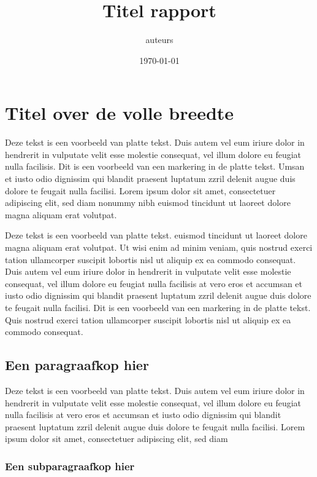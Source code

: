 \documentclass[dutch]{uureport}
\title[subtitle]{Titel rapport}
\author{auteurs}
\date{\today}
\begin{document}
\maketitle

\tableofcontents

\chapter{Titel over de volle breedte}

Deze tekst is een voorbeeld van platte tekst. Duis autem vel eum iriure dolor in hendrerit in vulputate velit esse molestie consequat, vel illum dolore eu feugiat nulla facilisis. Dit is een voorbeeld van een markering in de platte tekst. Umsan et iusto odio dignissim qui blandit praesent luptatum zzril delenit augue duis dolore te feugait nulla facilisi. Lorem ipsum dolor sit amet, consectetuer adipiscing elit, sed diam nonummy nibh euismod tincidunt ut laoreet dolore magna aliquam erat volutpat.

Deze tekst is een voorbeeld van platte tekst. euismod tincidunt ut laoreet dolore magna aliquam erat volutpat. Ut wisi enim ad minim veniam, quis nostrud exerci tation ullamcorper suscipit lobortis nisl ut aliquip ex ea commodo consequat. Duis autem vel eum iriure dolor in hendrerit in vulputate velit esse molestie consequat, vel illum dolore eu feugiat nulla facilisis at vero eros et accumsan et iusto odio dignissim qui blandit praesent luptatum zzril delenit augue duis dolore te feugait nulla facilisi. Dit is een voorbeeld van een markering in de platte tekst. Quis nostrud exerci tation ullamcorper suscipit lobortis nisl ut aliquip ex ea commodo consequat.

\section{Een paragraafkop hier}

Deze tekst is een voorbeeld van platte tekst. Duis autem vel eum
iriure dolor in hendrerit in vulputate velit esse molestie consequat,
vel illum dolore eu feugiat nulla facilisis at vero eros et accumsan
et iusto odio dignissim qui blandit praesent luptatum zzril delenit
augue duis dolore te feugait nulla facilisi. Lorem ipsum dolor sit
amet, consectetuer adipiscing elit, sed diam

\subsection{Een subparagraafkop hier}
\end{document}

